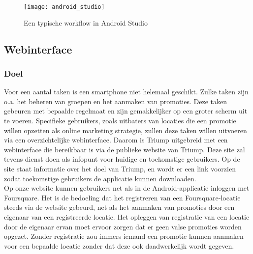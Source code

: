 \begin{figure}[H]
	\centering
	\texttt{[image: android\_studio]}
	\caption{Een typische workflow in Android Studio}
	\label{fig:Android Studio Workflow}
\end{figure}

\subsection{Webinterface}
\label{Webinterface}
\subsubsection{Doel}
Voor een aantal taken is een smartphone niet helemaal geschikt. Zulke taken zijn o.a. het beheren van groepen en het aanmaken van promoties.
Deze taken gebeuren met bepaalde regelmaat en zijn gemakkelijker op een groter scherm uit te voeren. Specifieke gebruikers, zoals uitbaters van locaties die een promotie willen opzetten als online marketing strategie, zullen deze taken willen uitvoeren via een overzichtelijke webinterface. Daarom is Triump uitgebreid met een webinterface die bereikbaar is via de publieke website van Triump.
Deze site zal tevens dienst doen als infopunt voor huidige en toekomstige gebruikers. Op de site staat informatie over het doel van Triump, en wordt er een link voorzien zodat toekomstige gebruikers de applicatie kunnen downloaden.\\
Op onze website kunnen gebruikers net als in de Android-applicatie inloggen met Foursquare. Het is de bedoeling dat het registreren van een Foursquare-locatie steeds via de website gebeurd, net als het aanmaken van promoties door een eigenaar van een registreerde locatie. Het opleggen van registratie van een locatie door de eigenaar ervan moet ervoor zorgen dat er geen valse promoties worden opgezet. Zonder registratie zou immers iemand een promotie kunnen aanmaken voor een bepaalde locatie zonder dat deze ook daadwerkelijk wordt gegeven.

